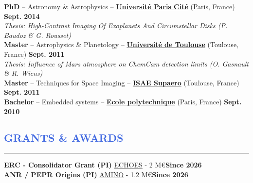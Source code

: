 \documentclass[11pt]{article}
\begin{document}
\vspace{-0.22cm}
\textbf{PhD} -- Astronomy \& Astrophysics --
\href{https://u-paris.fr/language/en/}{\textbf{Université Paris Cité}} (Paris, France)
\hfill  { \bf Sept. 2014}\\
{\small
\it Thesis: High-Contrast Imaging Of Exoplanets And Circumstellar Disks (P. Baudoz \& G. Rousset)}\\

\vspace{-0.22cm}
\textbf{Master} -- Astrophysics \& Planetology --
\href{https://www5.obs-mip.fr/masterasep/}{\textbf{Université de Toulouse}} (Toulouse, France)
\hfill  { \bf Sept. 2011} \\
{\small
\it Thesis: Influence of Mars atmosphere on ChemCam detection limits (O. Gasnault \& R. Wiens)}\\

\vspace{-0.22cm}
\textbf{Master} -- Techniques for Space Imaging -- \href{https://www.isae-supaero.fr/en/}{\textbf{\textbf{ISAE Supaero}}} (Toulouse, France) \hfill  { \bf Sept. 2011} \\

\vspace{-0.22cm}
\textbf{Bachelor} -- Embedded systems -- \href{https://www.polytechnique.edu/en/}{\textbf{\textbf{Ecole polytechnique}}} (Paris, France) \hfill    { \bf Sept. 2010}\\








\vspace{-0.45cm}
\textcolor{RoyalBlue}{\section{\large GRANTS \& AWARDS}
\vspace{-0.35cm}\hrule}

\vspace{0.4cm}
\textbf{ERC - Consolidator Grant (PI)} \href{https://lira.obspm.fr/erc-echoes}{ECHOES} - 2 M\euro \hfill \textbf{Since 2026}\\ 

\vspace{-0.25cm}
\textbf{ANR / PEPR Origins (PI)} \href{https://pepr-origins.fr/en/projet/advanced-multi-spectral-imaging-using-novel-wavefront-sensors-with-optical-photon-counting-detectors-amino-2/}{AMINO}  - 1.2 M\euro \hfill \textbf{Since 2026}\\ 
\end{document}
